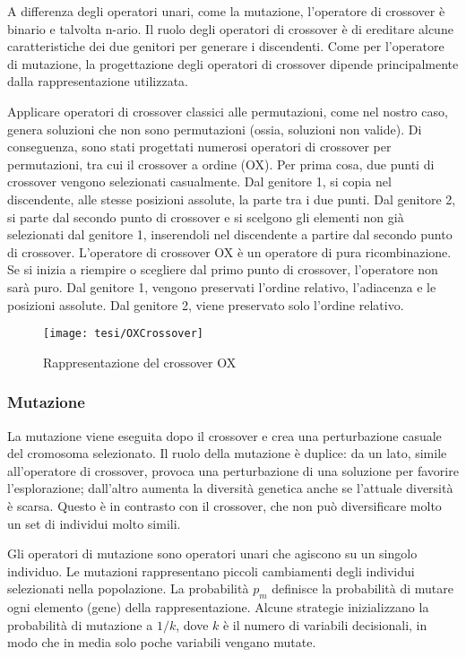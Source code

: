 A differenza degli operatori unari, come la mutazione, l'operatore di crossover è binario e talvolta n-ario. Il ruolo degli operatori di crossover è di ereditare alcune caratteristiche dei due genitori per generare i discendenti. Come per l'operatore di mutazione, la progettazione degli operatori di crossover dipende principalmente dalla rappresentazione utilizzata.

Applicare operatori di crossover classici alle permutazioni, come nel nostro caso, genera soluzioni che non sono permutazioni (ossia, soluzioni non valide). Di conseguenza, sono stati progettati numerosi operatori di crossover per permutazioni, tra cui il crossover a ordine (OX). Per prima cosa, due punti di crossover vengono selezionati casualmente. Dal genitore 1, si copia nel discendente, alle stesse posizioni assolute, la parte tra i due punti. Dal genitore 2, si parte dal secondo punto di crossover e si scelgono gli elementi non già selezionati dal genitore 1, inserendoli nel discendente a partire dal secondo punto di crossover. L'operatore di crossover OX è un operatore di pura ricombinazione. Se si inizia a riempire o scegliere dal primo punto di crossover, l'operatore non sarà puro. Dal genitore 1, vengono preservati l'ordine relativo, l'adiacenza e le posizioni assolute. Dal genitore 2, viene preservato solo l'ordine relativo.

\begin{figure}[!ht] 
    \centering 
    \texttt{[image: tesi/OXCrossover]} 
    \caption{Rappresentazione del crossover OX}
\end{figure}

\subsubsection{Mutazione}
La mutazione viene eseguita dopo il crossover e crea una perturbazione casuale del cromosoma selezionato. Il ruolo della mutazione è duplice: da un lato, simile all'operatore di crossover, provoca una perturbazione di una soluzione per favorire l'esplorazione; dall'altro aumenta la diversità genetica anche se l'attuale diversità è scarsa. Questo è in contrasto con il crossover, che non può diversificare molto un set di individui molto simili.

Gli operatori di mutazione sono operatori unari che agiscono su un singolo individuo. Le mutazioni rappresentano piccoli cambiamenti degli individui selezionati nella popolazione. La probabilità $p_m$ definisce la probabilità di mutare ogni elemento (gene) della rappresentazione. Alcune strategie inizializzano la probabilità di mutazione a $1/k$, dove $k$ è il numero di variabili decisionali, in modo che in media solo poche variabili vengano mutate.

